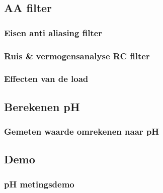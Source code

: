     \subsection*{AA filter}
    \begin{frame}
        \frametitle{Eisen anti aliasing filter}
    
        
    
    \end{frame}
    \begin{frame}
        \frametitle{Ruis \& vermogensanalyse RC filter}
    
        
    
    \end{frame}
    \begin{frame}
        \frametitle{Effecten van de load}
    
        
    
    \end{frame}

    \subsection*{Berekenen pH}
    \begin{frame}
        \frametitle{Gemeten waarde omrekenen naar pH}
    
        
    
    \end{frame}

    \subsection*{Demo}
    \begin{frame}
        \frametitle{pH metingsdemo}
    
        
    
    \end{frame}